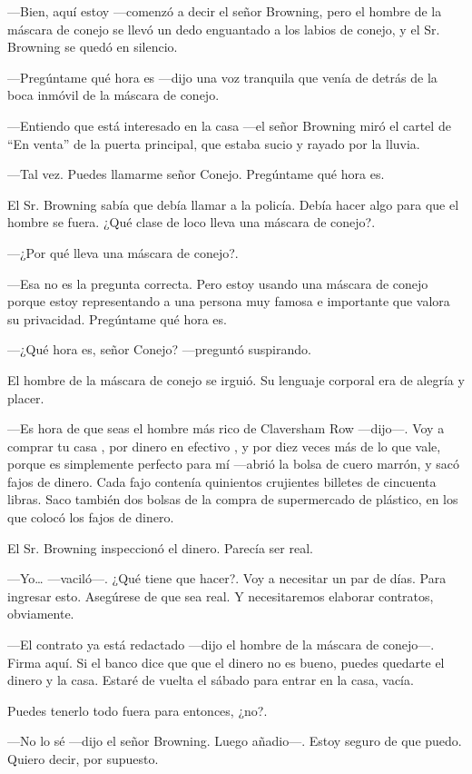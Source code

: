 ---Bien, aquí estoy ---comenzó a decir el señor Browning, pero el hombre de la máscara de conejo se llevó un dedo enguantado a los labios de conejo, y el Sr. Browning se quedó en silencio.

---Pregúntame qué hora es ---dijo una voz tranquila que venía de detrás de la boca inmóvil de la máscara de conejo.

---Entiendo que está interesado en la casa ---el señor Browning miró el cartel de ``En venta'' de la puerta principal, que estaba sucio y rayado por la lluvia.

---Tal vez. Puedes llamarme señor Conejo. Pregúntame qué hora es.

El Sr. Browning sabía que debía llamar a la policía. Debía hacer algo para que el hombre se fuera. ¿Qué clase de loco lleva una máscara de conejo?.

---¿Por qué lleva una máscara de conejo?.

---Esa no es la pregunta correcta. Pero estoy usando una máscara de conejo porque estoy representando a una persona muy famosa e importante que valora su privacidad. Pregúntame qué hora es.

---¿Qué hora es, señor Conejo? ---preguntó suspirando.

El hombre de la máscara de conejo se irguió. Su lenguaje corporal era de alegría y placer.

---Es hora de que seas el hombre más rico de Claversham Row ---dijo---. Voy a comprar tu casa , por dinero en efectivo , y por diez veces más de lo que vale, porque es simplemente perfecto para mí ---abrió la bolsa de cuero marrón, y sacó fajos de dinero. Cada fajo contenía quinientos crujientes billetes de cincuenta libras. Saco también dos bolsas de la compra de supermercado de plástico, en los que colocó los fajos de dinero.

El Sr. Browning inspeccionó el dinero. Parecía ser real.

---Yo\ldots{} ---vaciló---. ¿Qué tiene que hacer?. Voy a necesitar un par de días. Para ingresar esto. Asegúrese de que sea real. Y necesitaremos elaborar contratos, obviamente.

---El contrato ya está redactado ---dijo el hombre de la máscara de conejo---. Firma aquí. Si el banco dice que que el dinero no es bueno, puedes quedarte el dinero y la casa. Estaré de vuelta el sábado para entrar en la casa, vacía.

Puedes tenerlo todo fuera para entonces, ¿no?.

---No lo sé ---dijo el señor Browning. Luego añadio---. Estoy seguro de que puedo. Quiero decir, por supuesto.

